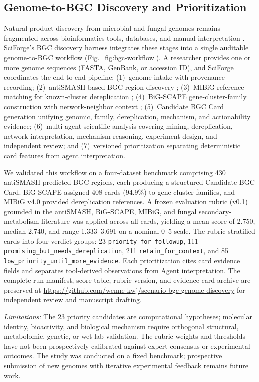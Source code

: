 \documentclass[sn-basic,Numbered,pdflatex]{sn-jnl}
\begin{document}
\subsection{Genome-to-BGC Discovery and Prioritization}

Natural-product discovery from microbial and fungal genomes remains fragmented across bioinformatics tools, databases, and manual interpretation \cite{keller2019fungal}. SciForge's BGC discovery harness integrates these stages into a single auditable genome-to-BGC workflow (Fig.~\ref{fig:bgc-workflow}). A researcher provides one or more genome sequences (FASTA, GenBank, or accession ID), and SciForge coordinates the end-to-end pipeline: (1)~genome intake with provenance recording; (2)~antiSMASH-based BGC region discovery \cite{blin2023antismash}; (3)~MIBiG reference matching for known-cluster dereplication \cite{zdouc2025mibig4}; (4)~BiG-SCAPE gene-cluster-family construction with network-neighbor context \cite{navarro2020bigscape}; (5)~Candidate BGC Card generation unifying genomic, family, dereplication, mechanism, and actionability evidence; (6)~multi-agent scientific analysis covering mining, dereplication, network interpretation, mechanism reasoning, experiment design, and independent review; and (7)~versioned prioritization separating deterministic card features from agent interpretation.

We validated this workflow on a four-dataset benchmark comprising 430 antiSMASH-predicted BGC regions, each producing a structured Candidate BGC Card. BiG-SCAPE assigned 408 cards (94.9\%) to gene-cluster families, and MIBiG v4.0 provided dereplication references. A frozen evaluation rubric (v0.1) grounded in the antiSMASH, BiG-SCAPE, MIBiG, and fungal secondary-metabolism literature was applied across all cards, yielding a mean score of 2.750, median 2.740, and range 1.333--3.691 on a nominal 0--5 scale. The rubric stratified cards into four verdict groups: 23 \texttt{priority\_for\_followup}, 111 \texttt{promising\_but\_needs\_dereplication}, 211 \texttt{retain\_for\_context}, and 85 \texttt{low\_priority\_until\_more\_evidence}. Each prioritization cites card evidence fields and separates tool-derived observations from Agent interpretation. The complete run manifest, score table, rubric version, and evidence-card archive are preserved at \url{https://github.com/wenne-kwj/scenario-bgc-genome-discovery} for independent review and manuscript drafting.

\textit{Limitations:} The 23 priority candidates are computational hypotheses; molecular identity, bioactivity, and biological mechanism require orthogonal structural, metabolomic, genetic, or wet-lab validation. The rubric weights and thresholds have not been prospectively calibrated against expert consensus or experimental outcomes. The study was conducted on a fixed benchmark; prospective submission of new genomes with iterative experimental feedback remains future work.
\end{document}
